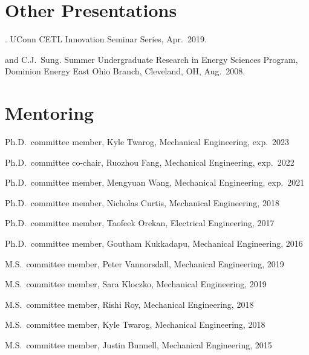\section{{\sectionfont Other Presentations}}

\begin{bibmune}
    \item {}.  UConn CETL Innovation
    Seminar Series, Apr.\ 2019.

    \item {} and C.J.\ Sung.  Summer Undergraduate Research in Energy Sciences Program,
    Dominion Energy East Ohio Branch, Cleveland, OH, Aug.\ 2008.\\
\end{bibmune}

\vspace{\baselineskip}

\section{\sectionfont{} Mentoring}

\begin{lonelist}
    \item Ph.D.\ committee member, Kyle Twarog, Mechanical Engineering, exp.\ 2023
    \item Ph.D.\ committee co-chair, Ruozhou Fang, Mechanical Engineering, exp.\ 2022
    \item Ph.D.\ committee member, Mengyuan Wang, Mechanical Engineering, exp.\ 2021
    \item Ph.D.\ committee member, Nicholas Curtis, Mechanical Engineering, 2018
    \item Ph.D.\ committee member, Taofeek Orekan, Electrical Engineering, 2017
    \item Ph.D.\ committee member, Goutham Kukkadapu, Mechanical Engineering, 2016
    \item M.S.\ committee member, Peter Vannorsdall, Mechanical Engineering, 2019
    \item M.S.\ committee member, Sara Kloczko, Mechanical Engineering, 2019
    \item M.S.\ committee member, Rishi Roy, Mechanical Engineering, 2018
    \item M.S.\ committee member, Kyle Twarog, Mechanical Engineering, 2018
    \item M.S.\ committee member, Justin Bunnell, Mechanical Engineering, 2015
\end{lonelist}

